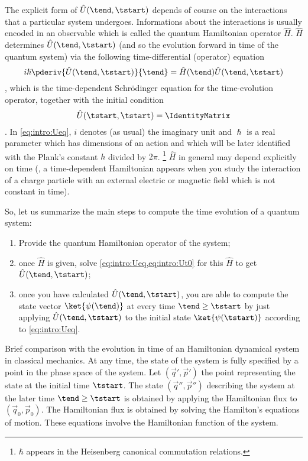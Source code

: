 The explicit  form of $\hat{U}(\tend, \tstart)$
depends of course on
the interactions that a particular system undergoes. Informations about the
interactions is usually encoded in an observable which is called the quantum Hamiltonian
operator $\hat{H}$.
$\hat{H}$ determines
$\hat{U}(\tend, \tstart)$ (and so the evolution forward in time of the quantum
system) via the following time-differential (operator) equation 
\begin{dmath}[label={intro:Ueq}]
   i\hslash \pderiv{\hat{U}(\tend, \tstart) }{\tend} = 
   \hat{H}(\tend) \hat{U}(\tend,\tstart)
\end{dmath},
which is the time-dependent Schr\"odinger equation for the time-evolution
operator, together with the initial condition 
\begin{dmath}[label={intro:Ut0}]
   \hat{U}(\tstart, \tstart) = \IdentityMatrix 
\end{dmath}.
In \cref{eq:intro:Ueq}, $i$ denotes (as usual) the imaginary unit and $\hslash$ is
a real parameter which has dimensions of an action and which will be later
identified with the Plank's constant $h$ divided by $2\pi$.%
\footnote{$\hbar$ appears in the Heisenberg canonical commutation relations.}
$\hat{H}$  in
general may depend explicitly on time (\eg, a time-dependent Hamiltonian appears
when you study the interaction of a charge particle with an external electric or
magnetic field which is not constant in time).

So, let us summarize the main steps to compute the time evolution of a quantum
system:
\begin{enumerate}
   \item\label{item:evolution:H} Provide the quantum Hamiltonian operator of the
      system;
   \item\label{item:evolution:U} once $\hat{H}$ is given, solve
      \cref{eq:intro:Ueq,eq:intro:Ut0} for this $\hat{H}$ to get $\hat{U}(\tend,
      \tstart)$;
   \item\label{item:evolution:applyU} once you have calculated $\hat{U}(\tend,
      \tstart)$, you are able to compute the state vector $\ket{\psi(\tend)}$ at
      every time $\tend \geq \tstart$ by just applying $\hat{U}(\tend, \tstart)$
      to the initial state $\ket{\psi(\tstart)}$ according to
      \cref{eq:intro:Ueq}.
\end{enumerate}

Brief comparison with the evolution in time of  an Hamiltonian dynamical system in classical mechanics.
At any time, the state of the system is fully specified by a point in the phase
space of the system.  Let $( \vec{q}', \vec{p}')$ the point representing the
state at the initial time $\tstart$.  The state $(\vec{q}'', \vec{p}'')$
describing the system at the later time $\tend\geq \tstart$ is obtained by
applying the Hamiltonian flux to $(\vec{q}_{0}, \vec{p}_{0})$.  The Hamiltonian
flux is obtained by solving the Hamilton's equations of motion.  These equations
involve the Hamiltonian function of the system.

